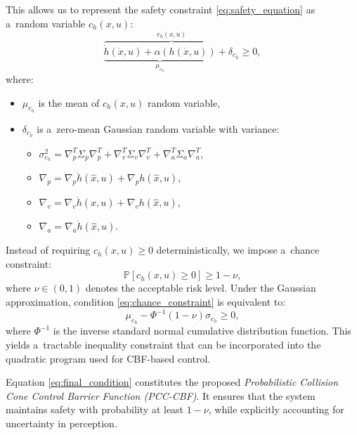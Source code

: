 \documentclass{svproc}
\begin{document}
This allows us to represent the safety constraint \eqref{eq:safety_equation}
as a~random variable $c_{h}(x,u)$:
\begin{equation}
    \label{eq:safety_equation_probabilistic}
    \overbrace{
    \underbrace{\dot{h}(\dot{x},u) + \alpha(h(\dot{x},u))}_{\mu_{c_h}} + \delta_{c_{h}}
    }^{c_{h}(x,u)} \geq 0,
\end{equation}
where:
\begin{itemize}
    \item $\mu_{c_{h}}$ is the mean of $c_{h}(x,u)$ random variable,
    \item $\delta_{c_{h}}$ is a~zero-mean Gaussian random variable with variance:
    \begin{itemize}
        \item $\sigma^{2}_{c_{h}} = \nabla_{p}^{T}\Sigma_{p}\nabla_{p}^{T} +
        \nabla_{v}^{T}\Sigma_{v}\nabla_{v}^{T} +
        \nabla_{a}^{T}\Sigma_{a}\nabla_{a}^{T}  $,
        \item $\nabla_{p} =  \nabla_{p} \dot{h}(\hat{x},u) + \nabla_{p}h(\hat{x},u)$,
        \item $\nabla_{v} =  \nabla_{v} \dot{h}(\hat{x},u) + \nabla_{v}h(\hat{x},u)$,
        \item $\nabla_{a} =  \nabla_{a} \dot{h}(\hat{x},u)$.
    \end{itemize}
\end{itemize}

Instead of requiring $c_{h}(x,u) \geq 0$ deterministically, we impose a~chance
constraint:
\begin{equation}
    \mathbb{P}\left[ c_{h}(x,u) \geq 0 \right] \geq 1 - \nu,
    \label{eq:chance_constraint}
\end{equation}
where $\nu \in (0,1)$ denotes the acceptable risk level.
Under the Gaussian approximation, condition \eqref{eq:chance_constraint} is equivalent to:
\begin{equation}
    \mu_{c_{h}} - \Phi^{-1}(1-\nu) \sigma_{c_{h}} \geq 0,
    \label{eq:final_condition}
\end{equation}
where $\Phi^{-1}$ is the inverse standard normal cumulative distribution function.
This yields a~tractable inequality constraint that can be incorporated into the
quadratic program used for CBF-based control.

Equation \eqref{eq:final_condition} constitutes the proposed
\emph{Probabilistic Collision Cone Control Barrier Function (PCC-CBF)}.
It ensures that the system maintains safety with probability at least $1-\nu$,
while explicitly accounting for uncertainty in perception.
\end{document}
